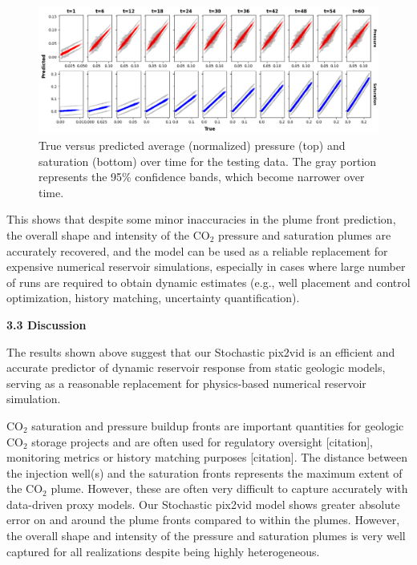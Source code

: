 \documentclass[10pt, twoside]{article}
\begin{document}
\begin{figure}
    \centering
    \includegraphics[width=16cm]{figures/r2ci.png}
    \caption{True versus predicted average (normalized) pressure (top) and saturation (bottom) over time for the testing data. The gray portion represents the 95\% confidence bands, which become narrower over time.}
    \label{r2ci}
\end{figure}

This shows that despite some minor inaccuracies in the plume front prediction, the overall shape and intensity of the CO$_2$ pressure and saturation plumes are accurately recovered, and the model can be used as a reliable replacement for expensive numerical reservoir simulations, especially in cases where large number of runs are required to obtain dynamic estimates (e.g., well placement and control optimization, history matching, uncertainty quantification).

\textbf{3.3 Discussion}

The results shown above suggest that our Stochastic pix2vid is an efficient and accurate predictor of dynamic reservoir response from static geologic models, serving as a reasonable replacement for physics-based numerical reservoir simulation. 

CO$_2$ saturation and pressure buildup fronts are important quantities for geologic CO$_2$ storage projects and are often used for regulatory oversight [citation], monitoring metrics or history matching purposes [citation]. The distance between the injection well(s) and the saturation fronts represents the maximum extent of the CO$_2$ plume. However, these are often very difficult to capture accurately with data-driven proxy models. Our Stochastic pix2vid model shows greater absolute error on and around the plume fronts compared to within the plumes. However, the overall shape and intensity of the pressure and saturation plumes is very well captured for all realizations despite being highly heterogeneous. 
\end{document}
